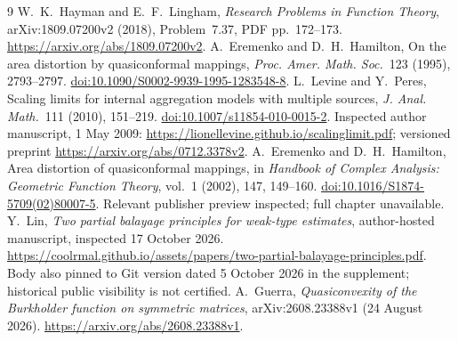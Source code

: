\documentclass[11pt]{article}
\begin{document}
\begin{thebibliography}{9}
 W.~K.~Hayman and E.~F.~Lingham,
\emph{Research Problems in Function Theory}, arXiv:1809.07200v2 (2018),
Problem~7.37, PDF pp.~172--173.
\url{https://arxiv.org/abs/1809.07200v2}.
 A.~Eremenko and D.~H.~Hamilton,
On the area distortion by quasiconformal mappings,
\emph{Proc. Amer. Math. Soc.}~123 (1995), 2793--2797.
\href{https://doi.org/10.1090/S0002-9939-1995-1283548-8}{doi:10.1090/S0002-9939-1995-1283548-8}.
 L.~Levine and Y.~Peres,
Scaling limits for internal aggregation models with multiple sources,
\emph{J. Anal. Math.}~111 (2010), 151--219.
\href{https://doi.org/10.1007/s11854-010-0015-2}{doi:10.1007/s11854-010-0015-2}.
Inspected author manuscript, 1 May 2009:
\url{https://lionellevine.github.io/scalinglimit.pdf};
versioned preprint \url{https://arxiv.org/abs/0712.3378v2}.
 A.~Eremenko and D.~H.~Hamilton,
Area distortion of quasiconformal mappings,
in \emph{Handbook of Complex Analysis: Geometric Function Theory},
vol.~1 (2002), 147, 149--160.
\href{https://doi.org/10.1016/S1874-5709(02)80007-5}{doi:10.1016/S1874-5709(02)80007-5}.
Relevant publisher preview inspected; full chapter unavailable.
 Y.~Lin, \emph{Two partial balayage principles for
weak-type estimates}, author-hosted manuscript, inspected 17 October 2026.
\url{https://coolrmal.github.io/assets/papers/two-partial-balayage-principles.pdf}.
Body also pinned to Git version dated 5 October 2026 in the supplement;
historical public visibility is not certified.
 A.~Guerra,
\emph{Quasiconvexity of the Burkholder function on symmetric matrices},
arXiv:2608.23388v1 (24 August 2026).
\url{https://arxiv.org/abs/2608.23388v1}.
\end{thebibliography}
\end{document}
